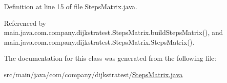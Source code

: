 Definition at line 15 of file Steps\-Matrix.\-java.



Referenced by main.\-java.\-com.\-company.\-dijkstratest.\-Steps\-Matrix.\-build\-Steps\-Matrix(), and main.\-java.\-com.\-company.\-dijkstratest.\-Steps\-Matrix.\-Steps\-Matrix().



The documentation for this class was generated from the following file\-:\begin{DoxyCompactItemize}
\item 
src/main/java/com/company/dijkstratest/\hyperlink{_steps_matrix_8java}{Steps\-Matrix.\-java}\end{DoxyCompactItemize}
